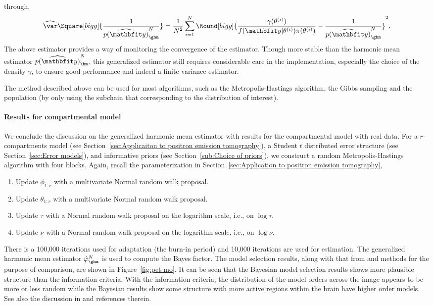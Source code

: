 through,
\begin{equation}
  \widehat{\var}\Square[bigg]{\frac{1}{\widehat{p(\data)}_{\ghm}^N}} =
  \frac{1}{N^2}\sum_{i=1}^N \Round[bigg]{
    \frac{\gamma(\theta^{(i)})}{f(\data|\theta^{(i)})\pi(\theta^{(i)})}
    - \frac{1}{\widehat{p(\data)}_{\ghm}^N}}^2.
\end{equation}
The above estimator provides a way of monitoring the convergence of the
estimator. Though more stable than the harmonic mean estimator
$\widehat{p(\data)}_{\hm}^N$, this generalized estimator still requires
considerable care in the implementation, especially the choice of the density
$\gamma$, to ensure good performance and indeed a finite variance estimator.

The method described above can be used for most \mcmc algorithms, such as the
Metropolis-Hastings algorithm, the Gibbs sampling and the population \mcmc (by
only using the subchain that corresponding to the distribution of interest).

\paragraph{Results for \pet compartmental model}

We conclude the discussion on the generalized harmonic mean estimator with
results for the \pet compartmental model with real data. For a
$r$-compartments \pet model (see Section~\ref{sec:Applicaiton to positron
  emission tomography}), a Student $t$ distributed error structure (see
Section~\ref{sec:Error models}), and informative priors (see
Section~\ref{sub:Choice of priors}), we construct a random Metropolis-Hastings
algorithm with four blocks. Again, recall the parameterization in
Section~\ref{sec:Application to positron emission tomography},
\begin{enumerate}
  \item Update $\phi_{1:r}$ with a multivariate Normal random walk proposal.
  \item Update $\theta_{1:r}$ with a multivariate Normal random walk proposal.
  \item Update $\tau$ with a Normal random walk proposal on the logarithm
    scale, i.e., on $\log\tau$.
  \item Update $\nu$ with a Normal random walk proposal on the logarithm
    scale, i.e., on $\log\nu$.
\end{enumerate}
There is a 100,000 iterations used for adaptation (the burn-in period) and
10,000 iterations are used for estimation. The generalized harmonic mean
estimator $\hat\varphi_{\ghm}^N$ is used to compute the Bayes factor. The
model selection results, along with that from \aic and \bic methods for the
purpose of comparison, are shown in Figure~\ref{fig:pet mo}. It can be seen
that the Bayesian model selection results shows more plausible structure than
the information criteria. With the information criteria, the distribution of
the model orders across the image appears to be more or less random while the
Bayesian results show some structure with more active regions within the brain
have higher order models. See also the discussion in \cite{Zhou2013} and
references therein.

